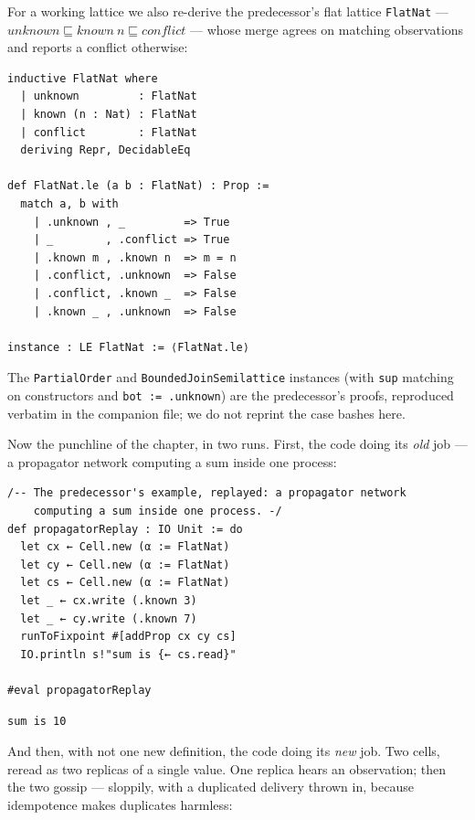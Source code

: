 \documentclass[12pt, a4paper, openright]{book}
\theoremstyle{thmstyle}
\theoremstyle{defstyle}
\newcommand{\lc}[1]{\texttt{#1}}
\begin{document}
For a working lattice we also re-derive the predecessor's flat lattice
\lc{FlatNat} --- $\mathit{unknown} \sqsubseteq \mathit{known}\ n
\sqsubseteq \mathit{conflict}$ --- whose merge agrees on matching
observations and reports a conflict otherwise:

\begin{verbatim}
inductive FlatNat where
  | unknown         : FlatNat
  | known (n : Nat) : FlatNat
  | conflict        : FlatNat
  deriving Repr, DecidableEq

def FlatNat.le (a b : FlatNat) : Prop :=
  match a, b with
    | .unknown , _         => True
    | _        , .conflict => True
    | .known m , .known n  => m = n
    | .conflict, .unknown  => False
    | .conflict, .known _  => False
    | .known _ , .unknown  => False

instance : LE FlatNat := ⟨FlatNat.le⟩
\end{verbatim}

The \lc{PartialOrder} and \lc{BoundedJoinSemilattice} instances (with
\lc{sup} matching on constructors and \lc{bot := .unknown}) are the
predecessor's proofs, reproduced verbatim in the companion file; we do
not reprint the case bashes here.

Now the punchline of the chapter, in two runs. First, the code doing its
\emph{old} job --- a propagator network computing a sum inside one
process:

\begin{verbatim}
/-- The predecessor's example, replayed: a propagator network
    computing a sum inside one process. -/
def propagatorReplay : IO Unit := do
  let cx ← Cell.new (α := FlatNat)
  let cy ← Cell.new (α := FlatNat)
  let cs ← Cell.new (α := FlatNat)
  let _ ← cx.write (.known 3)
  let _ ← cy.write (.known 7)
  runToFixpoint #[addProp cx cy cs]
  IO.println s!"sum is {← cs.read}"

#eval propagatorReplay
\end{verbatim}

\begin{verbatim}
sum is 10
\end{verbatim}

And then, with not one new definition, the code doing its \emph{new}
job. Two cells, reread as two replicas of a single value. One replica
hears an observation; then the two gossip --- sloppily, with a duplicated
delivery thrown in, because idempotence makes duplicates harmless:
\end{document}
